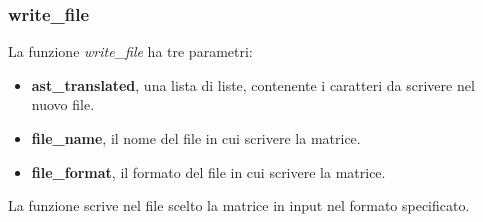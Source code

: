 \subsubsection{write\_file}
La funzione \textit{write\_file} ha tre parametri:
\begin{itemize}
\item \textbf{ast\_translated}, una lista di liste, contenente i caratteri da scrivere nel nuovo file.
\item \textbf{file\_name}, il nome del file in cui scrivere la matrice.
\item \textbf{file\_format}, il formato del file in cui scrivere la matrice.
\end{itemize}
La funzione scrive nel file scelto la matrice in input nel formato specificato.



























